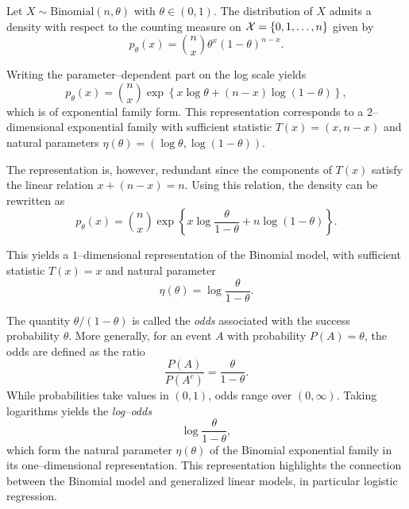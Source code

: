 \begin{ex}
    Let \(X \sim \text{Binomial}(n,\theta)\) with \(\theta \in (0,1)\).
    The distribution of \(X\) admits a density with respect to the counting measure on
    \(\mathcal{X}=\{0,1,\dots,n\}\) given by
    \[
        p_{\theta}(x)
        =
        \binom{n}{x}\theta^{x}(1-\theta)^{n-x}.
    \]

    Writing the parameter--dependent part on the log scale yields
    \[
        p_{\theta}(x)
        =
        \binom{n}{x}
        \exp\!\left\{
            x \log \theta + (n-x)\log(1-\theta)
        \right\},
    \]
    which is of exponential family form. This representation corresponds to a
    \(2\)--dimensional exponential family with sufficient statistic
    \(T(x) = (x, n-x)\) and natural parameters
    \(\eta(\theta) = (\log\theta, \log(1-\theta))\).

    The representation is, however, redundant since the components of \(T(x)\) satisfy
    the linear relation \(x + (n-x) = n\). Using this relation, the density can be rewritten as
    \[
        p_{\theta}(x)
        =
        \binom{n}{x}
        \exp\!\left\{
            x \log\frac{\theta}{1-\theta}
            + n \log(1-\theta)
        \right\}.
    \]

    This yields a \(1\)--dimensional representation of the Binomial model, with sufficient
    statistic \(T(x)=x\) and natural parameter
    \[
        \eta(\theta) = \log\frac{\theta}{1-\theta}.
    \]

The quantity \(\theta/(1-\theta)\) is called the \emph{odds} associated with the success
probability \(\theta\). More generally, for an event \(A\) with probability
\(P(A)=\theta\), the odds are defined as the ratio
\[
    \frac{P(A)}{P(A^{c})}
    =
    \frac{\theta}{1-\theta}.
\]
While probabilities take values in \((0,1)\), odds range over \((0,\infty)\).
Taking logarithms yields the \emph{log--odds}
\[
    \log\frac{\theta}{1-\theta},
\]
which form the natural parameter \(\eta(\theta)\) of the Binomial exponential family in its
one--dimensional representation. 
    This representation highlights the connection between
    the Binomial model and generalized linear models, in particular logistic regression.
\end{ex}

